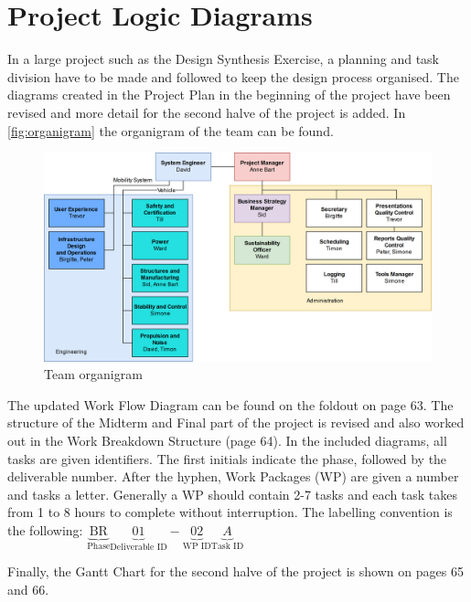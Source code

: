 \newpage
\chapter{Project Logic Diagrams}
\label{ch-diagrams}

In a large project such as the Design Synthesis Exercise, a planning and task division have to be made and followed to keep the design process organised. The diagrams created in the Project Plan in the beginning of the project have been revised and more detail for the second halve of the project is added. In \autoref{fig:organigram} the organigram of the team can be found. 



\begin{figure}[h]
    \centering
    \includegraphics[width=0.9\linewidth]{Figures/organigram.png}
    \captionsetup{justification=centering}
    \caption{Team organigram}
    \label{fig:organigram}
\end{figure}



The updated Work Flow Diagram can be found on the foldout on page 63. The structure of the Midterm and Final part of the project is revised and also worked out in the Work Breakdown Structure (page 64). In the included diagrams, all tasks are given identifiers. The first initials indicate the phase, followed by the deliverable number. After the hyphen, Work Packages (WP) are given a number and tasks a letter. Generally a WP should contain 2-7 tasks and each task takes from 1 to 8 hours to complete without interruption. The labelling convention is the following: $\underbrace{\text{BR}}_\text{Phase}\underbrace{01}_\text{Deliverable ID}-\underbrace{02}_\text{WP ID}\underbrace{A}_\text{Task ID}$ 

Finally, the Gantt Chart for the second halve of the project is shown on pages 65 and 66.





